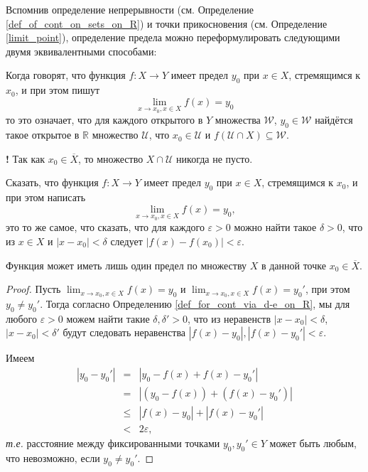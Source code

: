 Вспомнив определение непрерывности (см. Определение \ref{def_of_cont_on_sets_on_R}) и точки прикосновения (см. Определение \ref{limit_point}), определение предела можно переформулировать следующими двумя эквивалентными способами:

\begin{definition}\label{lim_via_neighberhoods}
Когда говорят, что функция $f: X \to Y$ имеет предел $y_0$ при $x \in X$, стремящимся к $x_0$, и при этом пишут
\[
 \lim_{x \to x_0, x \in X}f(x) = y_0
\]
то это означает, что для каждого открытого в $Y$ множества $\mathscr{W}$, $y_0 \in \mathscr{W}$ найдётся такое открытое в $\mathbb{R}$ множество $\mathscr{U}$, что $x_0 \in \mathscr{U}$ и $f(\mathscr{U}\cap X) \subseteq \mathscr{W}$. 
\end{definition}

\begin{mydanger}{\bf{!}}
    Так как $x_0 \in \overline{X}$, то множество $X \cap \mathscr{U}$ никогда не пусто.
\end{mydanger}

\begin{definition}\label{def_for_cont_via_d-e_on_R}
Сказать, что функция $f: X \to Y$ имеет предел $y_0$ при $x \in X$, стремящимся к $x_0$, и при этом написать
\[
 \lim_{x \to x_0, x \in X}f(x) = y_0,
\]
это то же самое, что сказать, что для каждого $\varepsilon>0$ можно найти такое $\delta >0$, что из $x \in X$ и $|x-x_0|<\delta$ следует $|f(x) - f(x_0)|<\varepsilon.$
\end{definition}

\begin{proposition}
 Функция может иметь лишь один предел по множеству $X$ в данной точке $x_0 \in \overline{X}.$
\end{proposition}
\begin{proof}
    Пусть  $\lim_{x \to x_0, x \in X}f(x) = y_0$ и $\lim_{x \to x_0, x \in X}f(x) = y_0'$, при этом $y_0 \ne y_0'$. Тогда согласно Определению \ref{def_for_cont_via_d-e_on_R}, мы для любого $\varepsilon>0$ можем найти такие $\delta, \delta' >0$, что из неравенств $|x-x_0|< \delta$, $|x-x_0|<\delta'$ будут следовать неравенства $|f(x) - y_0|, |f(x)-y_0'|<\varepsilon.$

Имеем
\begin{eqnarray*}
    |y_0 - y_0'| &=& |y_0 - f(x) + f(x) - y_0'| \\
    &=& |(y_0-f(x)) + (f(x) - y_0')| \\
    &\le & |f(x) - y_0| + |f(x) - y_0'| \\
    &<& 2 \varepsilon,
\end{eqnarray*}
\textit{т.е.} расстояние между фиксированными точками $y_0,y_0' \in Y$ может быть любым, что невозможно, если $y_0 \ne y_0'.$
\end{proof}





